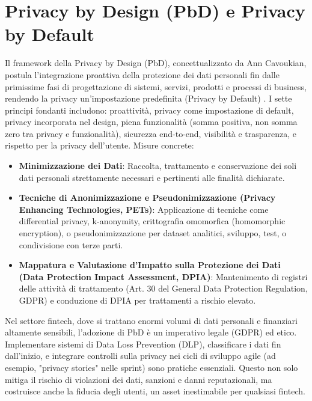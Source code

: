 \section{Privacy by Design (PbD) e Privacy by Default}
Il framework della Privacy by Design (PbD), concettualizzato da Ann Cavoukian, postula l'integrazione proattiva della protezione dei dati personali fin dalle primissime fasi di progettazione di sistemi, servizi, prodotti e processi di business, rendendo la privacy un'impostazione predefinita (Privacy by Default) \cite{Cavoukian_PbD_2009}. I sette principi fondanti includono: proattività, privacy come impostazione di default, privacy incorporata nel design, piena funzionalità (somma positiva, non somma zero tra privacy e funzionalità), sicurezza end-to-end, visibilità e trasparenza, e rispetto per la privacy dell'utente.
Misure concrete:
\begin{itemize}
\item \textbf{Minimizzazione dei Dati}: Raccolta, trattamento e conservazione dei soli dati personali strettamente necessari e pertinenti alle finalità dichiarate.
\item \textbf{Tecniche di Anonimizzazione e Pseudonimizzazione (Privacy Enhancing Technologies, PETs)}: Applicazione di tecniche come differential privacy, k-anonymity, crittografia omomorfica (homomorphic encryption), o pseudonimizzazione per dataset analitici, sviluppo, test, o condivisione con terze parti.
\item \textbf{Mappatura e Valutazione d'Impatto sulla Protezione dei Dati (Data Protection Impact Assessment, DPIA)}: Mantenimento di registri delle attività di trattamento (Art. 30 del General Data Protection Regulation, GDPR) e conduzione di DPIA per trattamenti a rischio elevato.
\end{itemize}
Nel settore fintech, dove si trattano enormi volumi di dati personali e finanziari altamente sensibili, l'adozione di PbD è un imperativo legale (GDPR) ed etico. Implementare sistemi di Data Loss Prevention (DLP), classificare i dati fin dall'inizio, e integrare controlli sulla privacy nei cicli di sviluppo agile (ad esempio, "privacy stories" nelle sprint) sono pratiche essenziali. Questo non solo mitiga il rischio di violazioni dei dati, sanzioni e danni reputazionali, ma costruisce anche la fiducia degli utenti, un asset inestimabile per qualsiasi fintech.
